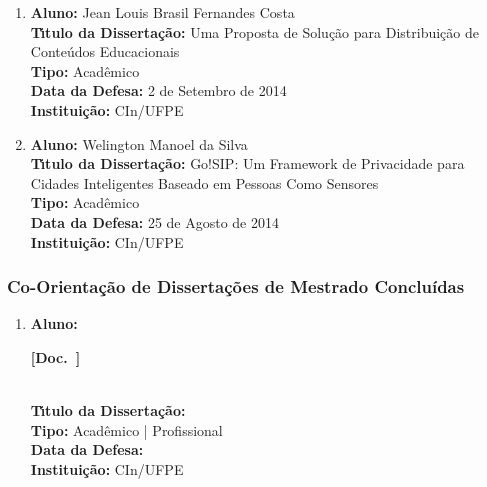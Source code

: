 \documentclass[a4paper,oneside,10pt]{article}
\newcounter{document}%
\newcommand\Doc{{\addtocounter{document}{1}\mbox{\sffamily\bfseries [Doc. \arabic{document}]}}}
\begin{document}
\begin{enumerate}
\item       \textbf{Aluno:} Jean Louis Brasil Fernandes Costa \mbox{} \\
            \textbf{T\'{\i}tulo da Disserta\c{c}\~{a}o:} Uma Proposta de Solução para Distribuição de Conteúdos Educacionais\\
            \textbf{Tipo:} Acadêmico\\
            \textbf{Data da Defesa:} 2 de Setembro de 2014\\
            \textbf{Institui\c{c}\~{a}o:} CIn/UFPE

\item       \textbf{Aluno:} Welington Manoel da Silva \mbox{} \\
            \textbf{T\'{\i}tulo da Disserta\c{c}\~{a}o:} Go!SIP: Um Framework de Privacidade para Cidades Inteligentes Baseado em Pessoas Como Sensores\\
            \textbf{Tipo:} Acadêmico\\
            \textbf{Data da Defesa:} 25 de Agosto de 2014\\
            \textbf{Institui\c{c}\~{a}o:} CIn/UFPE
\end{enumerate}


\subsubsection{Co-Orienta\c{c}\~{a}o de Disserta\c{c}\~{o}es de Mestrado Conclu\'{i}das}
\vspace{0.3cm}

\begin{enumerate}
\renewcommand{\labelenumi}{{\large\bfseries\arabic{enumi}.}}

\item       \textbf{Aluno:}  \Doc \\
            \textbf{T\'{\i}tulo da Disserta\c{c}\~{a}o:} \\
            \textbf{Tipo:} Acadêmico | Profissional\\
            \textbf{Data da Defesa:}  \\
            \textbf{Institui\c{c}\~{a}o:} CIn/UFPE

\end{enumerate}

\end{document}
